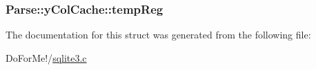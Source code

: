 \hypertarget{struct_parse_1_1y_col_cache_a61561cab1ce2e1914083777ae84c8fe8}{
\subsubsection[{temp\-Reg}]{ Parse\-::y\-Col\-Cache\-::temp\-Reg}}\label{struct_parse_1_1y_col_cache_a61561cab1ce2e1914083777ae84c8fe8}


The documentation for this struct was generated from the following file\-:\begin{DoxyCompactItemize}
\item 
Do\-For\-Me!/\hyperlink{sqlite3_8c}{sqlite3.\-c}\end{DoxyCompactItemize}
